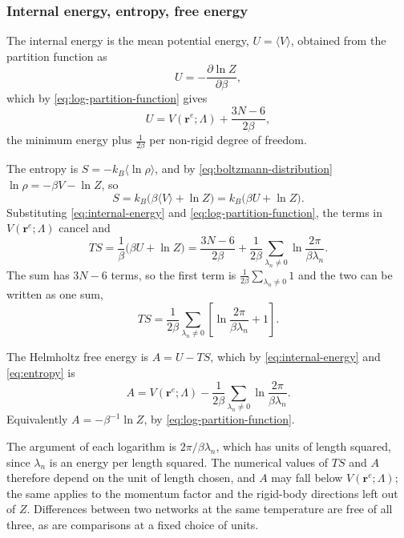 \documentclass[11pt]{article}
\newcommand{\rr}{\mathbf{r}}
\newcommand{\LL}{\Lambda}
\newcommand{\re}{\rr^{e}}
\begin{document}
\subsubsection{Internal energy, entropy, free energy}

The internal energy is the mean potential energy, $U = \langle V \rangle$, obtained from the partition function as
\begin{equation}
U = -\frac{\partial \ln Z}{\partial \beta} ,
\end{equation}
which by \eqref{eq:log-partition-function} gives
\begin{equation}
\boxed{
U = V(\re;\LL) + \frac{3N-6}{2\beta} ,
}
\label{eq:internal-energy}
\end{equation}
the minimum energy plus $\tfrac{1}{2\beta}$ per non-rigid degree of freedom.

The entropy is $S = -k_B \langle \ln \rho \rangle$, and by \eqref{eq:boltzmann-distribution} $\ln\rho = -\beta V - \ln Z$, so
\begin{equation}
S = k_B \big( \beta \langle V \rangle + \ln Z \big)
= k_B \big( \beta U + \ln Z \big) .
\end{equation}
Substituting \eqref{eq:internal-energy} and \eqref{eq:log-partition-function}, the terms in $V(\re;\LL)$ cancel and
\begin{equation}
T S = \frac{1}{\beta}\big( \beta U + \ln Z \big)
= \frac{3N-6}{2\beta} + \frac{1}{2\beta} \sum_{\lambda_n \ne 0} \ln\frac{2\pi}{\beta\lambda_n} .
\end{equation}
The sum has $3N-6$ terms, so the first term is $\tfrac{1}{2\beta}\sum_{\lambda_n \ne 0} 1$ and the two can be written as one sum,
\begin{equation}
\boxed{
T S = \frac{1}{2\beta}\sum_{\lambda_n \ne 0}
\left[\ln\frac{2\pi}{\beta\lambda_n} + 1\right] .
}
\label{eq:entropy}
\end{equation}

The Helmholtz free energy is $A = U - TS$, which by \eqref{eq:internal-energy} and \eqref{eq:entropy} is
\begin{equation}
\boxed{
A = V(\re;\LL) - \frac{1}{2\beta}\sum_{\lambda_n \ne 0} \ln\frac{2\pi}{\beta\lambda_n} .
}
\label{eq:free-energy}
\end{equation}
Equivalently $A = -\beta^{-1}\ln Z$, by \eqref{eq:log-partition-function}.

The argument of each logarithm is $2\pi/\beta\lambda_n$, which has units of length squared, since $\lambda_n$ is an energy per length squared.
The numerical values of $TS$ and $A$ therefore depend on the unit of length chosen, and $A$ may fall below $V(\re;\LL)$; the same applies to the momentum factor and the rigid-body directions left out of $Z$.
Differences between two networks at the same temperature are free of all three, as are comparisons at a fixed choice of units.
\end{document}
